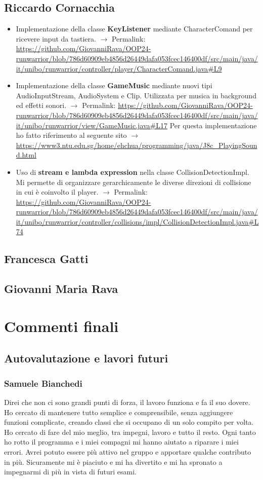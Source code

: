 \documentclass[a4paper,12pt]{report}
\begin{document}
\section{Riccardo Cornacchia}
\begin{itemize}
    \item Implementazione della classe \textbf{KeyListener} mediante CharacterComand per ricevere input da tastiera. $\rightarrow$ Permalink:
    \url{https://github.com/GiovanniRava/OOP24-runwarrior/blob/786d60909eb4856d26449dafa053fcec146400df/src/main/java/it/unibo/runwarrior/controller/player/CharacterComand.java#L9}
    \item Implementazione della classe \textbf{GameMusic} mediante nuovi tipi AudioInputStream, AudioSystem e Clip. 
    Utilizzata per musica in background ed effetti sonori. $\rightarrow$ Permalink:
    \url{https://github.com/GiovanniRava/OOP24-runwarrior/blob/786d60909eb4856d26449dafa053fcec146400df/src/main/java/it/unibo/runwarrior/view/GameMusic.java#L17}
    Per questa implementazione ho fatto riferimento al seguente sito $\rightarrow$
    \url{https://www3.ntu.edu.sg/home/ehchua/programming/java/J8c_PlayingSound.html}
    \item Uso di \textbf{stream e lambda expression} nella classe CollisionDetectionImpl. Mi permette di organizzare gerarchicamente 
    le diverse direzioni di collisione in cui è coinvolto il player. $\rightarrow$ Permalink:
    \url{https://github.com/GiovanniRava/OOP24-runwarrior/blob/786d60909eb4856d26449dafa053fcec146400df/src/main/java/it/unibo/runwarrior/controller/collisions/impl/CollisionDetectionImpl.java#L74}
\end{itemize}

\section{Francesca Gatti}
\section{Giovanni Maria Rava}

\chapter{Commenti finali}
\section{Autovalutazione e lavori futuri}
\subsection{Samuele Bianchedi}
Direi che non ci sono grandi punti di forza, il lavoro funziona e fa il suo dovere. Ho cercato di mantenere tutto semplice e comprensibile,
senza aggiungere funzioni complicate, creando classi che si occupano di un solo compito per volta.
Ho cercato di fare del mio meglio, tra impegni, lavoro e tutto il resto. Ogni tanto ho rotto il programma e i miei compagni mi hanno aiutato
a riparare i miei errori. Avrei potuto essere più attivo nel gruppo e apportare qualche contributo in più.
Sicuramente mi è piaciuto e mi ha divertito e mi ha spronato a impegnarmi di più in vista di futuri esami.
\end{document}
